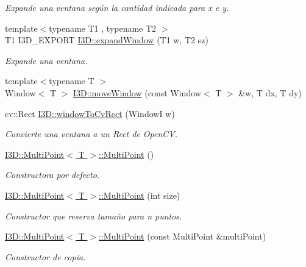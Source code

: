 \begin{DoxyCompactItemize}
\begin{DoxyCompactList}\small\item\em Expande una ventana según la cantidad indicada para x e y. \end{DoxyCompactList}\item 
{\footnotesize template$<$typename T1 , typename T2 $>$ }\\T1 I3\+D\+\_\+\+E\+X\+P\+O\+RT \hyperlink{group___geometric_entities_ga857396c24d042125f346f288db8e1fa2}{I3\+D\+::expand\+Window} (T1 w, T2 sz)
\begin{DoxyCompactList}\small\item\em Expande una ventana. \end{DoxyCompactList}\item 
{\footnotesize template$<$typename T $>$ }\\Window$<$ T $>$ \hyperlink{group___geometric_entities_ga5893c61910bdaf13dcbd435f1914d868}{I3\+D\+::move\+Window} (const Window$<$ T $>$ \&w, T dx, T dy)
\item 
cv\+::\+Rect \hyperlink{group___geometric_entities_gaafdd7fa6be1209a107b86fa04a9f3277}{I3\+D\+::window\+To\+Cv\+Rect} (WindowI w)
\begin{DoxyCompactList}\small\item\em Convierte una ventana a un Rect de Open\+CV. \end{DoxyCompactList}\item 
\hyperlink{group___geometric_entities_ga15cd19a3ddf5a39c3154efe440dde6c7}{I3\+D\+::\+Multi\+Point$<$ T $>$\+::\+Multi\+Point} ()
\begin{DoxyCompactList}\small\item\em Constructora por defecto. \end{DoxyCompactList}\item 
\hyperlink{group___geometric_entities_ga5581044092b6db2870f35347c8af5b73}{I3\+D\+::\+Multi\+Point$<$ T $>$\+::\+Multi\+Point} (int size)
\begin{DoxyCompactList}\small\item\em Constructor que reserva tamaño para n puntos. \end{DoxyCompactList}\item 
\hyperlink{group___geometric_entities_gaadc33d9d15e6fe63040915f1f39d9b40}{I3\+D\+::\+Multi\+Point$<$ T $>$\+::\+Multi\+Point} (const Multi\+Point \&multi\+Point)
\begin{DoxyCompactList}\small\item\em Constructor de copia. \end{DoxyCompactList}\item 

\end{DoxyCompactItemize}

